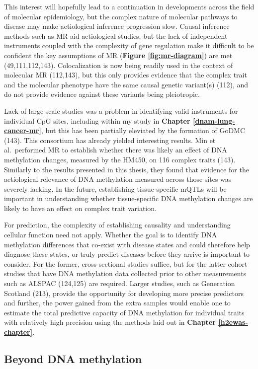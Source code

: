 \documentclass[11pt,oneside]{bristolthesis}
\begin{document}
This interest will hopefully lead to a continuation in developments across the field of molecular epidemiology, but the complex nature of molecular pathways to disease may make aetiological inference progression slow. Causal inference methods such as MR aid aetiological studies, but the lack of independent instruments coupled with the complexity of gene regulation make it difficult to be confident the key assumptions of MR (\textbf{Figure \ref{fig:mr-diagram}}) are met (49,111,112,143). Colocalization is now being readily used in the context of molecular MR (112,143), but this only provides evidence that the complex trait and the molecular phenotype have the same causal genetic variant(s) (112), and do not provide evidence against these variants being pleiotropic.

Lack of large-scale studies was a problem in identifying valid instruments for individual CpG sites, including within my study in \textbf{Chapter \ref{dnam-lung-cancer-mr}}, but this has been partially eleviated by the formation of GoDMC (143). This consortium has already yielded interesting results. Min et al.~performed MR to establish whether there was likely an effect of DNA methylation changes, measured by the HM450, on 116 complex traits (143). Similarly to the results presented in this thesis, they found that evidence for the aetiological relevance of DNA methylation measured across those sites was severely lacking. In the future, establishing tissue-specific mQTLs will be important in understanding whether tissue-specific DNA methylation changes are likely to have an effect on complex trait variation.

For prediction, the complexity of establishing causality and understanding cellular function need not apply. Whether the goal is to identify DNA methylation differences that co-exist with disease states and could therefore help diagnose these states, or truly predict diseases before they arrive is important to consider. For the former, cross-sectional studies suffice, but for the latter cohort studies that have DNA methylation data collected prior to other measurements such as ALSPAC (124,125) are required. Larger studies, such as Generation Scotland (213), provide the opportunity for developing more precise predictors and further, the power gained from the extra samples would enable one to estimate the total predictive capacity of DNA methylation for individual traits with relatively high precision using the methods laid out in \textbf{Chapter \ref{h2ewas-chapter}}.

\hypertarget{beyond-dnam}{%
\subsection{Beyond DNA methylation}\label{beyond-dnam}}
\end{document}

